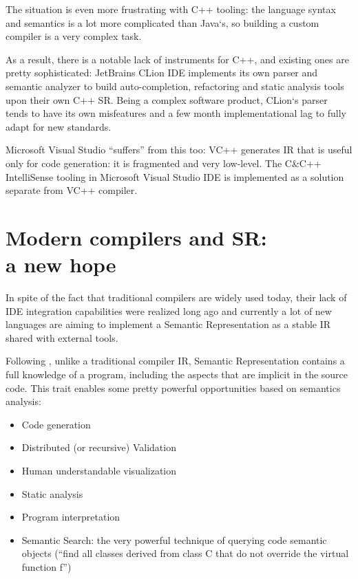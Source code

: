 The situation is even more frustrating with C++ tooling: the language syntax
and semantics is a lot more complicated than Java`s, so building a custom
compiler is a very complex task.

As a result, there is a notable lack of instruments for C++\cite{Zouev2010}, and existing
ones are pretty sophisticated: JetBrains CLion IDE implements its own parser
and semantic analyzer to build auto-completion, refactoring and static analysis
tools upon their own C++ SR. Being a complex software product, CLion`s parser
tends to have its own misfeatures and a few month implementational lag to
fully adapt for new standards.


Microsoft Visual Studio “suffers” from this too: VC++ generates IR that is useful
only for code generation: it is fragmented and very low-level.
The C\&C++ IntelliSense tooling in Microsoft Visual Studio IDE is implemented
as a solution separate from VC++ compiler.

\section{Modern compilers and SR: \\a new hope}
\label{sec:review_2}

In spite of the fact that traditional compilers are widely used today, their lack of
IDE integration capabilities were realized long ago and currently a lot of new
languages are aiming to implement a Semantic Representation as a stable IR
shared with external tools.

Following \cite{Zouev2005, Zouev2010}, unlike a traditional compiler IR, Semantic Representation contains a full
knowledge of a program, including the aspects that are implicit in the source
code. This trait enables some pretty powerful opportunities based on
semantics analysis:

\begin{itemize}
    \item Code generation
    \item Distributed (or recursive) Validation
    \item Human understandable visualization
    \item Static analysis
    \item Program interpretation
    \item Semantic Search: the very powerful technique of querying code semantic objects (“find all classes derived from class C that do not override the virtual function f”)    
\end{itemize}

